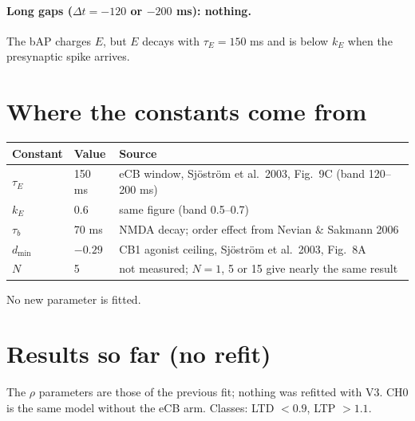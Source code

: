 \documentclass[11pt]{article}
\begin{document}
\paragraph{Long gaps ($\Delta t=-120$ or $-200$ ms): nothing.}
The bAP charges $E$, but $E$ decays with $\tau_E=150$ ms and is below $k_E$ when the presynaptic spike arrives.

\section{Where the constants come from}
\begin{center}
\begin{tabular}{l l l}
\toprule
Constant & Value & Source \\
\midrule
$\tau_E$ & 150 ms & eCB window, Sj\"ostr\"om et al.\ 2003, Fig.~9C (band 120--200 ms) \\
$k_E$ & 0.6 & same figure (band 0.5--0.7) \\
$\tau_b$ & 70 ms & NMDA decay; order effect from Nevian \& Sakmann 2006 \\
$d_{\min}$ & $-0.29$ & CB1 agonist ceiling, Sj\"ostr\"om et al.\ 2003, Fig.~8A \\
$N$ & 5 & not measured; $N=1$, 5 or 15 give nearly the same result \\
\bottomrule
\end{tabular}
\end{center}
No new parameter is fitted.

\section{Results so far (no refit)}
The $\rho$ parameters are those of the previous fit; nothing was refitted with V3.
CH0 is the same model without the eCB arm. Classes: LTD $<0.9$, LTP $>1.1$.
\end{document}
